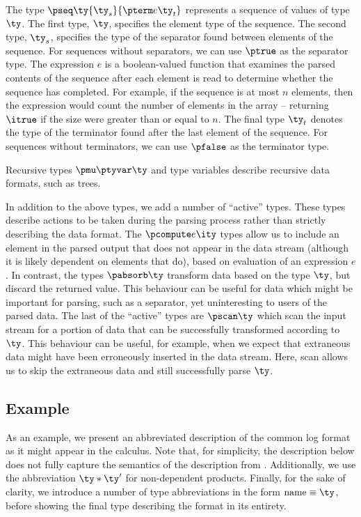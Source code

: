 The type $\pseq \ty {\ty_s} {\pterm e {\ty_t}}$ represents a sequence
of values of type $\ty$. The first type, $\ty$, specifies
the element type of the sequence. The second type, $\ty_s$, specifies
the type of the separator found between elements of the sequence. For
sequences without separators, we can use $\ptrue$ as the separator
type.  The expression $e$ is a boolean-valued function that examines
the parsed contents of the sequence after each element is read to
determine whether the sequence has completed. For example, if the
sequence is at most $n$ elements, then the expression would count the
number of elements in the array -- returning $\itrue$ if the size were
greater than or equal to $n$.  The final type $\ty_t$ denotes the type of the terminator found after the last element of the sequence.  For sequences without terminators, we can use $\pfalse$ as the terminator type.

Recursive types $\pmu \ptyvar \ty$ and type variables describe
recursive data formats, such as trees.

In addition to the above types, we add a number of ``active'' types.
These types describe actions to be taken during the parsing process
rather than strictly describing the data format. The $\pcompute e
\ity$ types allow us to include an element in the parsed output that
does not appear in the data stream (although it is likely dependent on
elements that do), based on evaluation of an expression $e$.  In
contrast, the types $\pabsorb \ty$ transform data based on the type
$\ty$, but discard the returned value. This behaviour can be useful
for data which might be important for parsing, such as a separator,
yet uninteresting to users of the parsed data. The last of the
``active'' types are $\pscan \ty$ which scan the input stream for a
portion of data that can be successfully transformed according to
$\ty$. This behaviour can be useful, for example, when we expect that
extraneous data might have been erroneously inserted in the data
stream. Here, scan allows us to skip the extraneous data and still
successfully parse $\ty$.

\subsection{Example}

As an example, we present an abbreviated description of the common log
format as it might appear in the calculus. Note that, for simplicity,
the description below does not fully capture the semantics of the
\ipads{} description from . Additionally, we
use the abbreviation $\ty * \ty'$ for non-dependent products. Finally,
for the sake of clarity, we introduce a number of type abbreviations
in the form $\mathrm{name} \equiv \ty$, before showing the final type
describing the format in its entirety.

